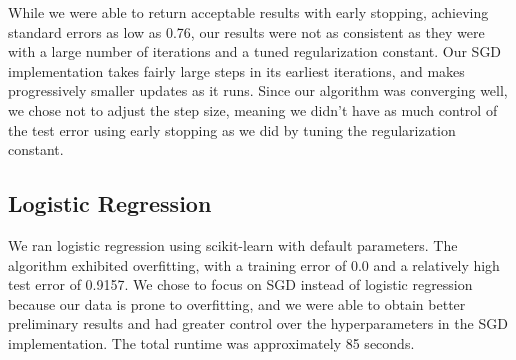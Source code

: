 \documentclass[journal]{IEEEtran}
\begin{document}

While we were able to return acceptable results with early stopping, achieving standard errors as low as 0.76, our results were not as consistent as they were with a large number of iterations and a tuned regularization constant.  Our SGD implementation takes fairly large steps in its earliest iterations, and makes progressively smaller updates as it runs.  Since our algorithm was converging well, we chose not to adjust the step size, meaning we didn't have as much control of the test error using early stopping as we did by tuning the regularization constant.

\subsection{Logistic Regression}

We ran logistic regression using scikit-learn with default parameters.  The algorithm exhibited overfitting, with a training error of 0.0 and a relatively high test error of 0.9157.  We chose to focus on SGD instead of logistic regression because our data is prone to overfitting, and we were able to obtain better preliminary results and had greater control over the hyperparameters in the SGD implementation.  The total runtime was approximately 85 seconds.
\end{document}
